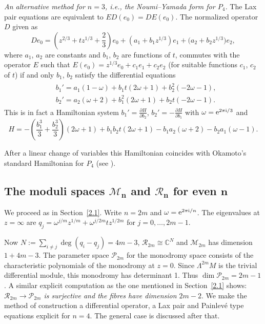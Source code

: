 \documentclass[10pt,a4paper]{amsart}
\numberwithin{equation}{section}
\begin{document}
 {\it An alternative method for $n=3$, i.e., the Noumi--Yamada form for $P_4$.}
The Lax pair equations are equivalent to $ED(e_0)=DE(e_0)$. The
normalized operator $D$ given as
\[De_0=\left(z^{2/3}+tz^{1/3}+\frac{2}{3}\right)e_0+(a_1+b_1z^{1/3})e_1+\bigl(a_2+b_2z^{1/3}\bigr)e_2,\] where
$a_1$, $a_2$ are constants and $b_1$, $b_2$ are functions of $t$, commutes with the operator $ E$ such that
$E(e_0)=z^{1/3}e_0+c_1e_1+c_2e_2$ (for suitable functions $c_1$, $c_2$ of $t$) if and only $b_1$, $b_2$ satisfy the differential equations
\begin{gather*}
\begin{split}
& b_1'=a_1(1-\omega)+b_1t(2\omega +1)+b_2^2(-2\omega -1),\\
& b_2'=a_2(\omega +2)+b_1^2(2\omega +1) +b_2t(-2\omega -1).
\end{split}
\end{gather*}
This is in fact a Hamiltonian system $b_1'=\frac{\partial H}{\partial b_2}$, $b_2'=-\frac{\partial H}{\partial b_1}$
with $\omega={\rm e}^{2\pi {\rm i}/3}$ and
\[
H=-\left(\frac{b_1^3}{3}+\frac{b_2^3}{3}\right)(2\omega +1)+b_1b_2t(2\omega +1)-b_1a_2(\omega +2) -b_2a_1(\omega -1).\]

After a linear change of variables this Hamiltonian coincides with Okamoto's standard Hamiltonian for $P_4$
(see \cite[p.~265]{O1}).

\subsection[The moduli spaces M\_n and R\_n for even n]{The moduli spaces $\boldsymbol{\mathcal{M}_n}$ and $\boldsymbol{\mathcal{R}_n}$ for even $\boldsymbol{n}$}

We proceed as in Section~\ref{2.1}.
Write $n=2m$ and $\omega ={\rm e}^{2\pi {\rm i}/n}$. The eigenvalues at $z=\infty$ are
$q_j= \omega^{j/m}z^{1/m}+ \omega ^{j/2m}tz^{1/2m}$ for $j=0,\dots ,2m-1$.

Now $N:=\sum _{i\neq j} \deg (q_i-q_j)=4m-3$, $\mathcal{R}_{2m}\cong \mathbb{C}^{N}$ and $\mathcal{M}_{2m}$
has dimension $1+4m-3$. The parameter space $\mathcal{P}_{2m}$ for the monodromy space
consists of the characteristic polynomials of the monodromy at $z=0$. Since $\Lambda^{2m}M$ is the trivial differential module, this
monodromy has determinant 1. Thus $\dim \mathcal{P}_{2m}=2m-1$. A similar explicit computation as the one
mentioned in Section~\ref{2.1} shows:
{\it $\mathcal{R}_{2m}\rightarrow \mathcal{P}_{2m}$ is surjective and the fibres have dimension $2m-2$}.
We make the method of construction a differential operator, a Lax pair and Painlev\'e type equations explicit for $n=4$. The general case is discussed after that.
\end{document}
